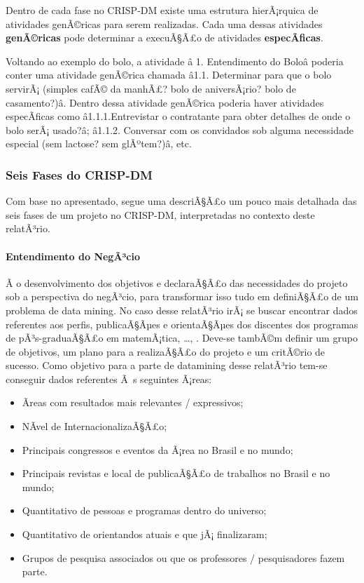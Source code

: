 \documentclass[]{article}
\providecommand{\tightlist}{%
  \setlength{\itemsep}{0pt}\setlength{\parskip}{0pt}}
\let\oldparagraph\paragraph
\renewcommand{\paragraph}[1]{\oldparagraph{#1}\mbox{}}
\begin{document}
Dentro de cada fase no CRISP-DM existe uma estrutura hierÃ¡rquica de
atividades genÃ©ricas para serem realizadas. Cada uma dessas atividades
\textbf{genÃ©ricas} pode determinar a execuÃ§Ã£o de atividades
\textbf{especÃ­ficas}.

Voltando ao exemplo do bolo, a atividade â 1. Entendimento do Boloâ
poderia conter uma atividade genÃ©rica chamada â1.1. Determinar para
que o bolo servirÃ¡ (simples cafÃ© da manhÃ£? bolo de aniversÃ¡rio? bolo
de casamento?)â. Dentro dessa atividade genÃ©rica poderia haver
atividades especÃ­ficas como â1.1.1.Entrevistar o contratante para
obter detalhes de onde o bolo serÃ¡ usado?â; â1.1.2. Conversar com
os convidados sob alguma necessidade especial (sem lactose? sem
glÃºtem?)â, etc.

\subsubsection{Seis Fases do CRISP-DM}\label{seis-fases-do-crisp-dm}

Com base no apresentado, segue uma descriÃ§Ã£o um pouco mais detalhada
das seis fases de um projeto no CRISP-DM, interpretadas no contexto
deste relatÃ³rio.

\paragraph{\texorpdfstring{\textbf{Entendimento do
NegÃ³cio}}{Entendimento do NegÃ³cio}}\label{entendimento-do-negacio}

Ã o desenvolvimento dos objetivos e declaraÃ§Ã£o das necessidades do
projeto sob a perspectiva do negÃ³cio, para transformar isso tudo em
definiÃ§Ã£o de um problema de data mining. No caso desse relatÃ³rio irÃ¡
se buscar encontrar dados referentes aos perfis, publicaÃ§Ãµes e
orientaÃ§Ãµes dos discentes dos programas de pÃ³s-graduaÃ§Ã£o em
matemÃ¡tica, \ldots{}, . Deve-se tambÃ©m definir um grupo de objetivos,
um plano para a realizaÃ§Ã£o do projeto e um critÃ©rio de sucesso. Como
objetivo para a parte de datamining desse relatÃ³rio tem-se conseguir
dados referentes Ã~s seguintes Ã¡reas:

\begin{itemize}
\tightlist
\item
  Ãreas com resultados mais relevantes / expressivos;\\
\item
  NÃ­vel de InternacionalizaÃ§Ã£o;
\item
  Principais congressos e eventos da Ã¡rea no Brasil e no mundo;
\item
  Principais revistas e local de publicaÃ§Ã£o de trabalhos no Brasil e
  no mundo;
\item
  Quantitativo de pessoas e programas dentro do universo;
\item
  Quantitativo de orientandos atuais e que jÃ¡ finalizaram;
\item
  Grupos de pesquisa associados ou que os professores / pesquisadores
  fazem parte.
\end{itemize}
\end{document}
